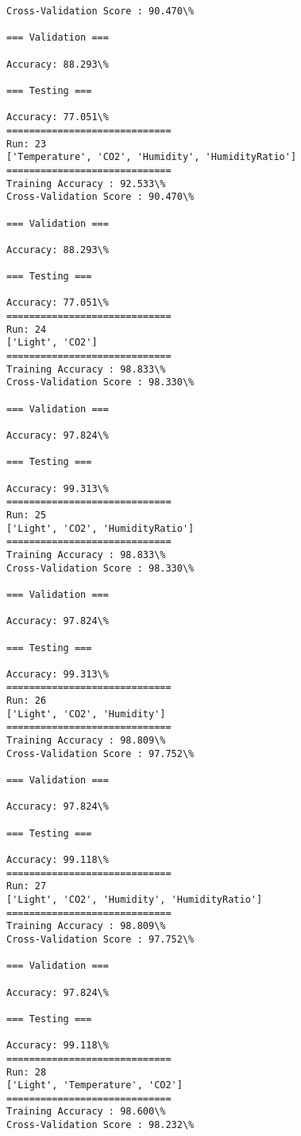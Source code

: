 \documentclass[11pt]{article}
\begin{document}
    \begin{Verbatim}[commandchars=\\\{\}]
Cross-Validation Score : 90.470\%

=== Validation ===

Accuracy: 88.293\%

=== Testing ===

Accuracy: 77.051\%
=============================
Run: 23
['Temperature', 'CO2', 'Humidity', 'HumidityRatio']
=============================
Training Accuracy : 92.533\%
Cross-Validation Score : 90.470\%

=== Validation ===

Accuracy: 88.293\%

=== Testing ===

Accuracy: 77.051\%
=============================
Run: 24
['Light', 'CO2']
=============================
Training Accuracy : 98.833\%
Cross-Validation Score : 98.330\%

=== Validation ===

Accuracy: 97.824\%

=== Testing ===

Accuracy: 99.313\%
=============================
Run: 25
['Light', 'CO2', 'HumidityRatio']
=============================
Training Accuracy : 98.833\%
Cross-Validation Score : 98.330\%

=== Validation ===

Accuracy: 97.824\%

=== Testing ===

Accuracy: 99.313\%
=============================
Run: 26
['Light', 'CO2', 'Humidity']
=============================
Training Accuracy : 98.809\%
Cross-Validation Score : 97.752\%

=== Validation ===

Accuracy: 97.824\%

=== Testing ===

Accuracy: 99.118\%
=============================
Run: 27
['Light', 'CO2', 'Humidity', 'HumidityRatio']
=============================
Training Accuracy : 98.809\%
Cross-Validation Score : 97.752\%

=== Validation ===

Accuracy: 97.824\%

=== Testing ===

Accuracy: 99.118\%
=============================
Run: 28
['Light', 'Temperature', 'CO2']
=============================
Training Accuracy : 98.600\%
Cross-Validation Score : 98.232\%


\end{Verbatim}
\end{document}
